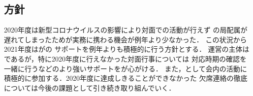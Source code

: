 \subsection*{\newGradeIfKouki{}\thirdGrade{}方針}


2020年度は新型コロナウイルスの影響により対面での活動が行えず
\firstGrade{}の局配属が遅れてしまったため\firstGrade{}が実務に携わる機会が例年より少なかった．
この状況から2021年度は\newGradeIfKouki{}\thirdGrade{}が\newGradeIfKouki{}\secondGrade{}の
サポートを例年よりも積極的に行う方針とする．
運営の主体は\newGradeIfKouki{}\secondGrade{}であるが，特に2020年度に行えなかった対面行事については
対応時期の確認を一緒に行うなどのより強いサポートを\newGradeIfKouki{}\thirdGrade{}が心がける．
また，\newGradeIfKouki{}\thirdGrade{}として会内の活動に積極的に参加する．2020年度に達成しきることができなかった
欠席連絡の徹底については今後の課題として引き続き取り組んでいく．


